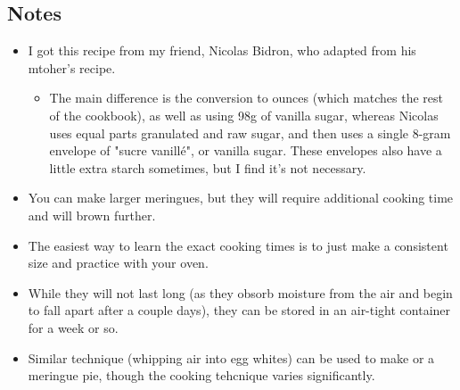 \begin{multicols}{2}
\subsection*{Notes}
\begin{itemize}
    \item I got this recipe from my friend, Nicolas Bidron, who adapted from his mtoher's recipe.
    \begin{itemize}
        \item The main difference is the conversion to ounces (which matches the rest of the cookbook), as well as using 98g of vanilla sugar, whereas Nicolas uses equal parts granulated and raw sugar, and then uses a single 8-gram envelope of "sucre vanillé", or vanilla sugar. These envelopes also have a little extra starch sometimes, but I find it's not necessary.
    \end{itemize}
    \item You can make larger meringues, but they will require additional cooking time and will brown further.
    \item The easiest way to learn the exact cooking times is to just make a consistent size and practice with your oven.
    \item While they will not last long (as they obsorb moisture from the air and begin to fall apart after a couple days), they can be stored in an air-tight container for a week or so.
    \item Similar technique (whipping air into egg whites) can be used to make  or a meringue pie, though the cooking tehcnique varies significantly.
\end{itemize}
\end{multicols}
\clearpage